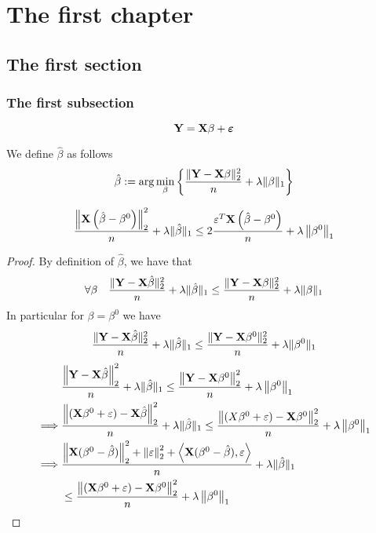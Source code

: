 \chapter{The first chapter}
\section{The first section}
\subsection{The first subsection}

\begin{equation}
    \label{def: linear model (matrix)}
    \mathbf{Y} = \mathbf{X} \beta + \boldsymbol{\varepsilon}
\end{equation}

We define $\hat \beta$ as follows
\begin{equation}
    \label{not: beta hat}
    \hat{\beta}:=\arg \min _{\beta}\left\{\frac{\|\mathbf{Y}-\mathbf{X} \beta\|_{2}^{2}}{n}+\lambda\|\beta\|_{1}\right\}
\end{equation}

\begin{lemma}
    $$\frac{\left\| \mathbf{X} \left(\hat{\beta}-\beta^{0}\right)\right\|_{2}^{2}}{n} + \lambda\|\hat{\beta}\|_{1} \leq 2 \frac{\varepsilon^{T} \mathbf{X}\left(\hat{\beta}-\beta^{0}\right)}{n}+\lambda\left\|\beta^{0}\right\|_{1}$$
\end{lemma}
\begin{proof}
    By definition of $\hat \beta$, we have that
    $$
        \forall \beta \quad \frac{\|\mathbf{Y}-\mathbf{X} \hat \beta\|_{2}^{2}}{n}+\lambda\| \hat \beta\|_{1} \leq \frac{\|\mathbf{Y}-\mathbf{X} \beta \|_{2}^{2}}{n}+\lambda\| \beta \|_{1}
    $$
    In particular for $\beta = \beta^0$ we have
    $$
        \frac{\|\mathbf{Y}-\mathbf{X} \hat \beta \|_{2}^{2}}{n}+\lambda\| \hat \beta \|_{1} \leq \frac{\|\mathbf{Y}-\mathbf{X} \beta^0\|_{2}^{2}}{n}+\lambda\| \beta^0\|_{1}
    $$
    \begin{align*}
                 & \frac{\left\|\mathbf{Y}  - \mathbf{X} \hat{\beta} \right\|_{2}^{2}}{n} + \lambda \| \hat{\beta}\|_{1} \leq \frac{\left\| \mathbf{Y}  - \mathbf{X} \beta^0 \right\|_2^2}{n}+\lambda\left\|\beta^{0}\right\|_{1}                                                   \\
        \implies & \frac{\left\| ( \mathbf{X} \beta^0  + \varepsilon) - \mathbf{X} \hat{\beta} \right\|_{2}^{2}}{n} + \lambda \| \hat{\beta}\|_{1} \leq \frac{\left\| (X \beta^0  + \varepsilon)  - \mathbf{X} \beta^0 \right\|_2^2}{n}+\lambda\left\|\beta^{0}\right\|_{1} \\
        \implies & \frac{\left\| \mathbf{X} (\beta^0  - \hat{\beta}) \right\|_2^2 + \left\| \varepsilon \right\|_{2}^{2} + \left\langle \mathbf{X} (\beta^0  - \hat{\beta}), \varepsilon \right\rangle}{n} + \lambda \| \hat{\beta}\|_{1}                           \\
                 & \leq \frac{\left\| (\mathbf{X} \beta^0  + \varepsilon)  - \mathbf{X} \beta^0 \right\|_2^2}{n}+\lambda\left\|\beta^{0}\right\|_{1}
    \end{align*}
\end{proof}